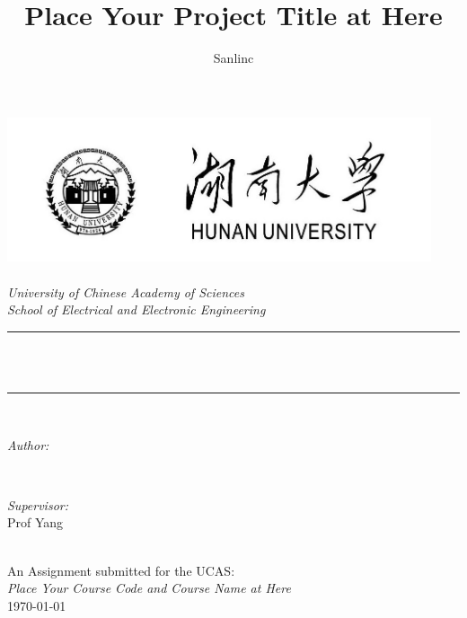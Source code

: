 \documentclass[12pt]{article}
\title{Place Your Project Title at Here}
\author{\textup{Sanlinc}}
\begin{document}
    \renewcommand\theequation{\thesubsection.\arabic{equation}}
    \newtheorem{mythm}{定理}[section]  %

\begin{titlepage}
	\newcommand{\HRule}{\rule{\linewidth}{0.5mm}}
	\includegraphics[width=12.5cm]{sc_logo.jpg}\\[1cm] 
	\center 
	\quad\\[1.5cm]
	\textsl{\Large University of Chinese Academy of Sciences }\\[0.5cm] 
	\textsl{\large School of Electrical and Electronic Engineering}\\[0.5cm] 
	\makeatletter
	\HRule \\[0.4cm]
	{ \huge \bfseries \@title}\\[0.4cm] 
	\HRule \\[1.5cm]
	\begin{minipage}{0.4\textwidth}
		\begin{flushleft} \large
			\emph{Author:}\\
			\@author 
		\end{flushleft}
	\end{minipage}
	~
	\begin{minipage}{0.4\textwidth}
		\begin{flushright} \large
			\emph{Supervisor:} \\
			\textup{Prof Yang}
		\end{flushright}
	\end{minipage}\\[3cm]
	\makeatother
	{\large An Assignment submitted for the UCAS:}\\[0.5cm]
	{\large \emph{Place Your Course Code and Course Name at Here}}\\[0.5cm]
	{\large \today}\\[2cm] 
	\vfill 
\end{titlepage}

\thispagestyle{empty}
\clearpage     %
\tableofcontents        %
\clearpage     %
\pagestyle{headings}
\end{document}
